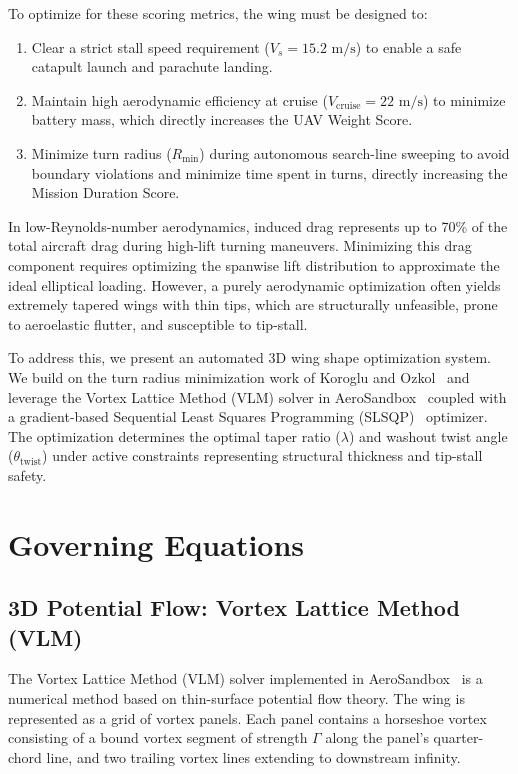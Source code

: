 \documentclass[11pt]{article}
\begin{document}
To optimize for these scoring metrics, the wing must be designed to:
\begin{enumerate}
    \item Clear a strict stall speed requirement ($V_s = 15.2\text{ m/s}$) to enable a safe catapult launch and parachute landing.
    \item Maintain high aerodynamic efficiency at cruise ($V_{\text{cruise}} = 22\text{ m/s}$) to minimize battery mass, which directly increases the UAV Weight Score.
    \item Minimize turn radius ($R_{\text{min}}$) during autonomous search-line sweeping to avoid boundary violations and minimize time spent in turns, directly increasing the Mission Duration Score.
\end{enumerate}

In low-Reynolds-number aerodynamics, induced drag represents up to 70\% of the total aircraft drag during high-lift turning maneuvers. Minimizing this drag component requires optimizing the spanwise lift distribution to approximate the ideal elliptical loading. However, a purely aerodynamic optimization often yields extremely tapered wings with thin tips, which are structurally unfeasible, prone to aeroelastic flutter, and susceptible to tip-stall.

To address this, we present an automated 3D wing shape optimization system. We build on the turn radius minimization work of Koroglu and Ozkol~\cite{koroglu2019} and leverage the Vortex Lattice Method (VLM) solver in AeroSandbox~\cite{sharpe2021} coupled with a gradient-based Sequential Least Squares Programming (SLSQP)~\cite{kraft1988} optimizer. The optimization determines the optimal taper ratio ($\lambda$) and washout twist angle ($\theta_{\text{twist}}$) under active constraints representing structural thickness and tip-stall safety.

\section{Governing Equations}

\subsection{3D Potential Flow: Vortex Lattice Method (VLM)}
The Vortex Lattice Method (VLM) solver implemented in AeroSandbox~\cite{sharpe2021} is a numerical method based on thin-surface potential flow theory. The wing is represented as a grid of vortex panels. Each panel contains a horseshoe vortex consisting of a bound vortex segment of strength $\Gamma$ along the panel's quarter-chord line, and two trailing vortex lines extending to downstream infinity.
\end{document}
